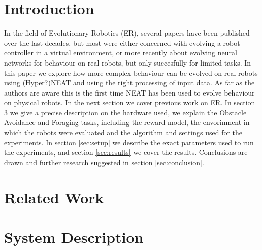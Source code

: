 \documentclass{article}
\begin{document}
	\maketitle
	\section{Introduction} %
	\label{sec:Introduction}
	In the field of Evolutionary Robotics (ER), several papers have been
	published over the last decades, but most were either concerned
	with evolving a robot controller in a virtual environment, or more recently
	about evolving neural networks for behaviour on real robots, but only
	succesfully for limited tasks.
	In this paper we explore how more complex behaviour can be evolved on real
	robots using (Hyper?)NEAT and using the right processing of input data. As
	far as the authors are aware this is the first time NEAT has been used to
	evolve behaviour on physical robots.
	In the next section we cover previous work on ER. In section
	\ref{sec:method} we give a precise description on the hardware used, we
	explain the Obstacle Avoidance and Foraging tasks, including the reward
	model, the envorinment in which the robots were evaluated and the algorithm
	and settings used for the experiments.
	In section \ref{sec:setup} we describe the exact parameters used to run the
	experiments, and section \ref{sec:results} we cover the results.
	Conclusions are drawn and further research suggested in section
	\ref{sec:conclusion}.

	\section{Related Work} %
	\label{sec:Related Work}
	\cite{heinermanevolution}
	\cite{silva2012odneat}
	\cite{stanley2002evolving, stanley2009hypercube, stanley2006real}

	\section{System Description} %
	\label{sec:method}
\end{document}
